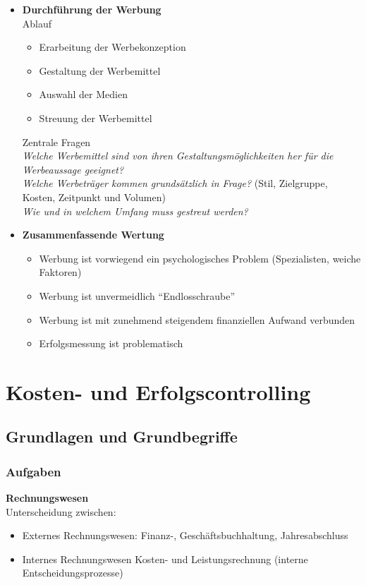 \documentclass[a4paper,11pt, twoside]{article}
\begin{document}
\begin{itemize}
\item \textbf{Durchführung der Werbung}\\
Ablauf
\begin{itemize}
	\item Erarbeitung der Werbekonzeption
	\item Gestaltung der Werbemittel
	\item Auswahl der Medien
	\item Streuung der Werbemittel
\end{itemize}

Zentrale Fragen\\
\textit{Welche Werbemittel sind von ihren Gestaltungsmöglichkeiten her für die Werbeaussage geeignet?}\\
\textit{Welche Werbeträger kommen grundsätzlich in Frage?} (Stil, Zielgruppe, Kosten, Zeitpunkt und Volumen)\\
\textit{Wie und in welchem Umfang muss gestreut werden?}\\

\item \textbf{Zusammenfassende Wertung}
\begin{itemize}
	\item Werbung ist vorwiegend ein psychologisches Problem (Spezialisten, weiche Faktoren)
	\item Werbung ist unvermeidlich "`Endlosschraube"'
	\item Werbung ist mit zunehmend steigendem finanziellen Aufwand verbunden
	\item Erfolgsmessung ist problematisch	
\end{itemize}

\end{itemize}
\newpage
\section{Kosten- und Erfolgscontrolling}

\subsection{Grundlagen und Grundbegriffe}

\subsubsection*{Aufgaben}
\textbf{Rechnungswesen}\\
Unterscheidung zwischen:
\begin{itemize}
	\item Externes Rechnungswesen: Finanz-, Geschäftsbuchhaltung, Jahresabschluss
	\item Internes Rechnungswesen Kosten- und Leistungsrechnung (interne Entscheidungsprozesse)
\end{itemize}
\end{document}
